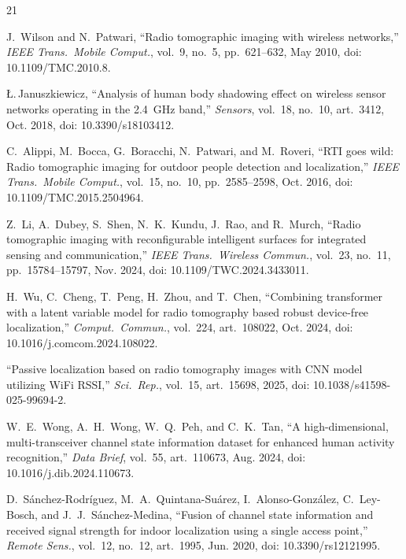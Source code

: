 \documentclass[journal,10pt]{IEEEtran}
\begin{document}
\begin{thebibliography}{21}

 J.~Wilson and N.~Patwari, ``Radio tomographic imaging with
wireless networks,'' \emph{IEEE Trans.\ Mobile Comput.}, vol.~9, no.~5,
pp.~621--632, May 2010, doi: 10.1109/TMC.2010.8.

 {\L}.\,Januszkiewicz, ``Analysis of human body
shadowing effect on wireless sensor networks operating in the 2.4~GHz band,''
\emph{Sensors}, vol.~18, no.~10, art.~3412, Oct. 2018, doi:
10.3390/s18103412.

 C.~Alippi, M.~Bocca, G.~Boracchi, N.~Patwari, and
M.~Roveri, ``RTI goes wild: Radio tomographic imaging for outdoor people
detection and localization,'' \emph{IEEE Trans.\ Mobile Comput.}, vol.~15,
no.~10, pp.~2585--2598, Oct. 2016, doi: 10.1109/TMC.2015.2504964.

 Z.~Li, A.~Dubey, S.~Shen, N.~K.~Kundu, J.~Rao, and R.~Murch,
``Radio tomographic imaging with reconfigurable intelligent surfaces for
integrated sensing and communication,'' \emph{IEEE Trans.\ Wireless Commun.},
vol.~23, no.~11, pp.~15784--15797, Nov. 2024, doi: 10.1109/TWC.2024.3433011.

 H.~Wu, C.~Cheng, T.~Peng, H.~Zhou, and T.~Chen, ``Combining
transformer with a latent variable model for radio tomography based robust
device-free localization,'' \emph{Comput.\ Commun.}, vol.~224, art.~108022,
Oct. 2024, doi: 10.1016/j.comcom.2024.108022.

 ``Passive localization based on radio tomography images
with CNN model utilizing WiFi RSSI,'' \emph{Sci.\ Rep.}, vol.~15, art.~15698,
2025, doi: 10.1038/s41598-025-99694-2.

 W.~E.~Wong, A.~H.~Wong, W.~Q.~Peh, and C.~K.~Tan, ``A
high-dimensional, multi-transceiver channel state information dataset for
enhanced human activity recognition,'' \emph{Data Brief}, vol.~55,
art.~110673, Aug. 2024, doi: 10.1016/j.dib.2024.110673.

 D.~S\'anchez-Rodr\'iguez, M.~A.~Quintana-Su\'arez,
I.~Alonso-Gonz\'alez, C.~Ley-Bosch, and J.~J.~S\'anchez-Medina, ``Fusion of
channel state information and received signal strength for indoor localization
using a single access point,'' \emph{Remote Sens.}, vol.~12, no.~12,
art.~1995, Jun. 2020, doi: 10.3390/rs12121995.


\end{thebibliography}
\end{document}
